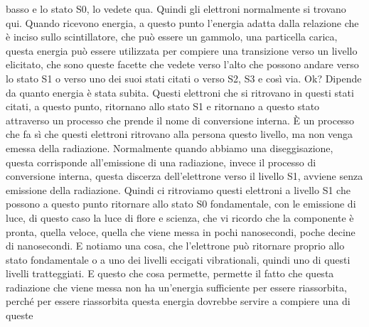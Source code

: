 basso e lo stato S0, lo vedete qua. Quindi gli elettroni normalmente si trovano qui. Quando ricevono energia, a questo punto l'energia adatta dalla relazione che è inciso sullo scintillatore, che può essere un gammolo, una particella carica, questa energia può essere utilizzata per compiere una transizione verso un livello elicitato, che sono queste facette che vedete verso l'alto che possono andare verso lo stato S1 o verso uno dei suoi stati citati o verso S2, S3 e così via. Ok? Dipende da quanto energia è stata subita. Questi elettroni che si ritrovano in questi stati citati, a questo punto, ritornano allo stato S1 e ritornano a questo stato attraverso un processo che prende il nome di conversione interna. È un processo che fa sì che questi elettroni ritrovano alla persona questo livello, ma non venga emessa della radiazione. Normalmente quando abbiamo una diseggisazione, questa corrisponde all'emissione di una radiazione, invece il processo di conversione interna, questa discerza dell'elettrone verso il livello S1, avviene senza emissione della radiazione. Quindi ci ritroviamo questi elettroni a livello S1 che possono a questo punto ritornare allo stato S0 fondamentale, con le emissione di luce, di questo caso la luce di flore e scienza, che vi ricordo che la componente è pronta, quella veloce, quella che viene messa in pochi nanosecondi, poche decine di nanosecondi. E notiamo una cosa, che l'elettrone può ritornare proprio allo stato fondamentale o a uno dei livelli eccigati vibrationali, quindi uno di questi livelli tratteggiati. E questo che cosa permette, permette il fatto che questa radiazione che viene messa non ha un'energia sufficiente per essere riassorbita, perché per essere riassorbita questa energia dovrebbe servire a compiere una di queste 

